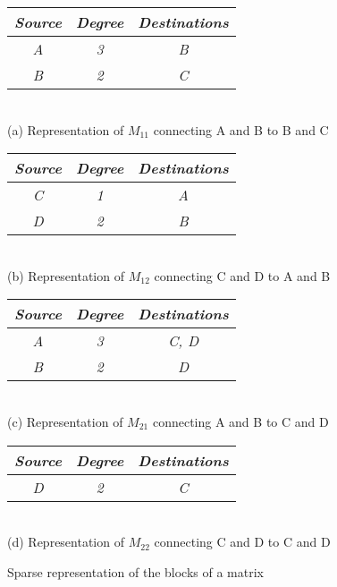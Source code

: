 \begin{figure}[H]
\centering
\begin{tabular}{|c|c|c|}
  \hline
  \textit{Source} & \textit{Degree} & \textit{Destinations} \\
  \hline
  \textit{A} & \textit{3} & \textit{B} \\
  \textit{B} & \textit{2} & \textit{C} \\
  \hline
\end{tabular}
\captionsetup{justification=centering}\\
\addvspace{1em}
\textrm{(a) Representation of $M_{11}$ connecting A and B to B and C}

\addvspace{2em}
\begin{tabular}{|c|c|c|}
  \hline
  \textit{Source} & \textit{Degree} & \textit{Destinations} \\
  \hline
  \textit{C} & \textit{1} & \textit{A} \\
  \textit{D} & \textit{2} & \textit{B} \\
  \hline
\end{tabular}
\captionsetup{justification=centering}\\
\addvspace{1em}
\textrm{(b) Representation of $M_{12}$ connecting C and D to A and B}

\addvspace{2em}
\begin{tabular}{|c|c|c|}
  \hline
  \textit{Source} & \textit{Degree} & \textit{Destinations} \\
  \hline
  \textit{A} & \textit{3} & \textit{C, D} \\
  \textit{B} & \textit{2} & \textit{D} \\
  \hline
\end{tabular}
\captionsetup{justification=centering}\\
\addvspace{1em}
\textrm{(c) Representation of $M_{21}$ connecting A and B to C and D}

\addvspace{2em}
\begin{tabular}{|c|c|c|}
  \hline
  \textit{Source} & \textit{Degree} & \textit{Destinations} \\
  \hline
  \textit{D} & \textit{2} & \textit{C} \\
  \hline
\end{tabular}
\captionsetup{justification=centering}\\
\addvspace{1em}
\textrm{(d) Representation of $M_{22}$ connecting C and D to C and D}

\caption{Sparse representation of the blocks of a matrix}
\label{fig:sparse-representation-blocks-matrix}
\end{figure}

